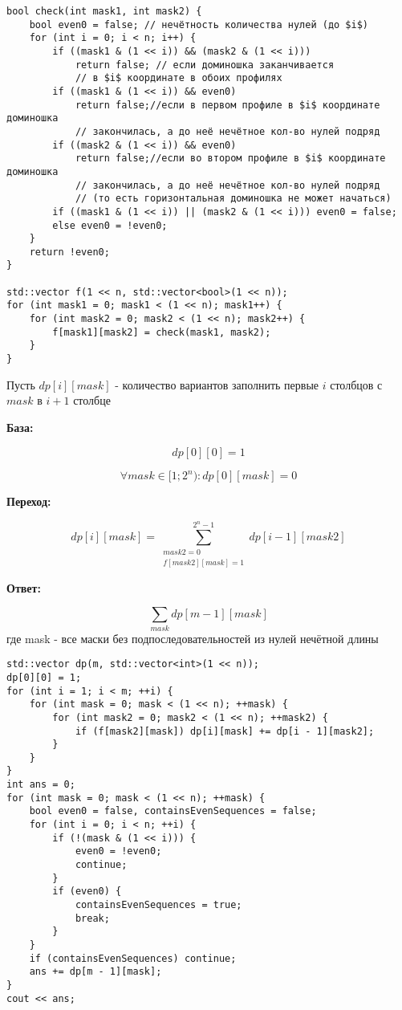 \begin{verbatim}
bool check(int mask1, int mask2) {
    bool even0 = false; // нечётность количества нулей (до $i$)
    for (int i = 0; i < n; i++) {
        if ((mask1 & (1 << i)) && (mask2 & (1 << i)))
            return false; // если доминошка заканчивается
            // в $i$ координате в обоих профилях
        if ((mask1 & (1 << i)) && even0)
            return false;//если в первом профиле в $i$ координате доминошка
            // закончилась, а до неё нечётное кол-во нулей подряд
        if ((mask2 & (1 << i)) && even0)
            return false;//если во втором профиле в $i$ координате доминошка
            // закончилась, а до неё нечётное кол-во нулей подряд
            // (то есть горизонтальная доминошка не может начаться)
        if ((mask1 & (1 << i)) || (mask2 & (1 << i))) even0 = false;
        else even0 = !even0;
    }
    return !even0;
}

std::vector f(1 << n, std::vector<bool>(1 << n));
for (int mask1 = 0; mask1 < (1 << n); mask1++) {
    for (int mask2 = 0; mask2 < (1 << n); mask2++) {
        f[mask1][mask2] = check(mask1, mask2);
    }
}
\end{verbatim}

Пусть $dp[i][mask]$ - количество вариантов заполнить первые $i$ столбцов с $mask$ в $i + 1$ столбце

\textbf{База:}

$$dp[0][0] = 1$$

$$\forall mask \in [{1;2^n}): dp[0][mask] = 0$$

\textbf{Переход:}

$$dp[i][mask] = \sum_{\substack{mask2 = 0 \\ f[mask2][mask] = 1}}^{2^n - 1} dp[i - 1][mask2]$$

\textbf{Ответ:}

$$\sum_{mask} dp[m - 1][mask]$$
где mask - все маски без подпоследовательностей из нулей нечётной длины

\begin{verbatim}
std::vector dp(m, std::vector<int>(1 << n));
dp[0][0] = 1;
for (int i = 1; i < m; ++i) {
    for (int mask = 0; mask < (1 << n); ++mask) {
        for (int mask2 = 0; mask2 < (1 << n); ++mask2) {
            if (f[mask2][mask]) dp[i][mask] += dp[i - 1][mask2];
        }
    }
}
int ans = 0;
for (int mask = 0; mask < (1 << n); ++mask) {
    bool even0 = false, containsEvenSequences = false;
    for (int i = 0; i < n; ++i) {
        if (!(mask & (1 << i))) {
            even0 = !even0;
            continue;
        }
        if (even0) {
            containsEvenSequences = true;
            break;
        }
    }
    if (containsEvenSequences) continue;
    ans += dp[m - 1][mask];
}
cout << ans;
\end{verbatim}